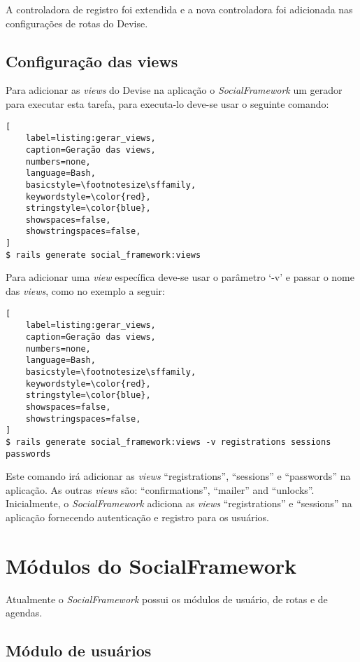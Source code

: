 A controladora de registro foi extendida e a nova controladora foi adicionada nas configurações de rotas do Devise.

\subsection{Configuração das views}

Para adicionar as \textit{views} do Devise na aplicação o \textit{SocialFramework} um gerador para executar esta tarefa, para executa-lo deve-se usar o seguinte comando:

\begin{lstlisting}[
    label=listing:gerar_views,
    caption=Geração das views,
    numbers=none,
    language=Bash,
    basicstyle=\footnotesize\sffamily,
    keywordstyle=\color{red},
    stringstyle=\color{blue},
    showspaces=false,
    showstringspaces=false,
]
$ rails generate social_framework:views
\end{lstlisting}

Para adicionar uma \textit{view} específica deve-se usar o parâmetro `-v' e passar o nome das \textit{views}, como no exemplo a seguir:

\begin{lstlisting}[
    label=listing:gerar_views,
    caption=Geração das views,
    numbers=none,
    language=Bash,
    basicstyle=\footnotesize\sffamily,
    keywordstyle=\color{red},
    stringstyle=\color{blue},
    showspaces=false,
    showstringspaces=false,
]
$ rails generate social_framework:views -v registrations sessions passwords
\end{lstlisting}

Este comando irá adicionar as \textit{views} ``registrations'', ``sessions'' e ``passwords'' na aplicação. As outras \textit{views} são: ``confirmations'', ``mailer'' and ``unlocks''. Inicialmente, o \textit{SocialFramework} adiciona as \textit{views} ``registrations'' e ``sessions'' na aplicação fornecendo autenticação e registro para os usuários.

\section{Módulos do SocialFramework}
\label{sec:modulos_socialframework}

Atualmente o \textit{SocialFramework} possui os módulos de usuário, de rotas e de agendas.

\subsection{Módulo de usuários}

